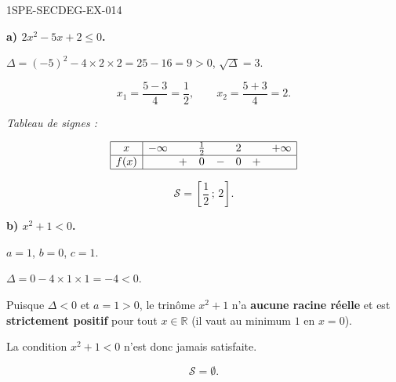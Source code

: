 \begin{corrige}{1SPE-SECDEG-EX-014}

\textbf{a) $2x^2 - 5x + 2 \leqslant 0$.}


$\Delta = (-5)^2 - 4 \times 2 \times 2 = 25 - 16 = 9 > 0$, $\sqrt{\Delta} = 3$.

\[x_1 = \frac{5 - 3}{4} = \frac{1}{2}, \qquad x_2 = \frac{5 + 3}{4} = 2.\]

\textit{Tableau de signes :}


\[
\begin{array}{|c|ccccccc|}
\hline
x & -\infty & & \tfrac{1}{2} & & 2 & & +\infty \\
\hline
f(x) & & + & 0 & - & 0 & + & \\
\hline
\end{array}
\]

\[\boxed{\mathcal{S} = \left[\frac{1}{2}\,;\,2\right].}\]

\medskip
\textbf{b) $x^2 + 1 < 0$.}


$a = 1$, $b = 0$, $c = 1$.

$\Delta = 0 - 4 \times 1 \times 1 = -4 < 0$.

Puisque $\Delta < 0$ et $a = 1 > 0$, le trinôme $x^2 + 1$ n'a \textbf{aucune racine réelle} et est \textbf{strictement positif} pour tout $x \in \mathbb{R}$ (il vaut au minimum $1$ en $x = 0$).

La condition $x^2 + 1 < 0$ n'est donc jamais satisfaite.

\[\boxed{\mathcal{S} = \emptyset.}\]

\end{corrige}

